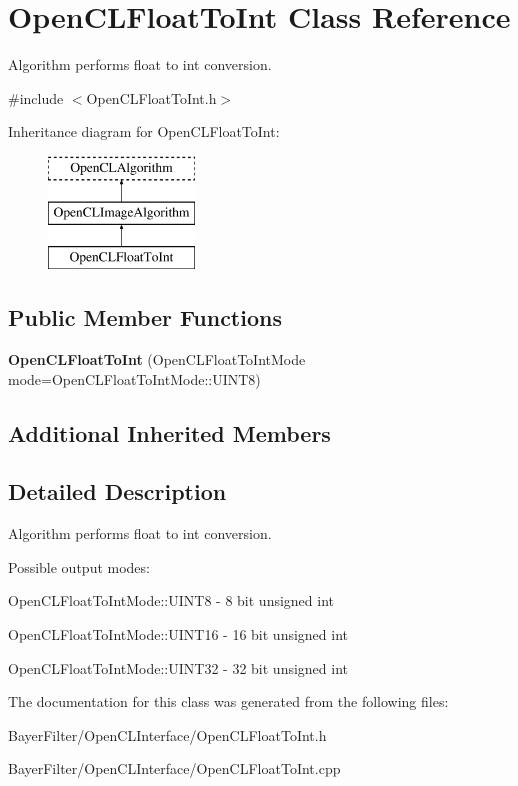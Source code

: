 \hypertarget{class_open_c_l_float_to_int}{\section{Open\-C\-L\-Float\-To\-Int Class Reference}
\label{class_open_c_l_float_to_int}
}


Algorithm performs float to int conversion.  




{\ttfamily \#include $<$Open\-C\-L\-Float\-To\-Int.\-h$>$}

Inheritance diagram for Open\-C\-L\-Float\-To\-Int\-:\begin{figure}[H]
\begin{center}
\leavevmode
\includegraphics[height=3.000000cm]{class_open_c_l_float_to_int}
\end{center}
\end{figure}
\subsection*{Public Member Functions}
\begin{DoxyCompactItemize}
\item 
\hypertarget{class_open_c_l_float_to_int_af489585d5af10a6350133be43c6dd948}{{\bfseries Open\-C\-L\-Float\-To\-Int} (Open\-C\-L\-Float\-To\-Int\-Mode mode=Open\-C\-L\-Float\-To\-Int\-Mode\-::\-U\-I\-N\-T8)}\label{class_open_c_l_float_to_int_af489585d5af10a6350133be43c6dd948}

\end{DoxyCompactItemize}
\subsection*{Additional Inherited Members}


\subsection{Detailed Description}
Algorithm performs float to int conversion. 

Possible output modes\-:
\begin{DoxyItemize}
\item Open\-C\-L\-Float\-To\-Int\-Mode\-::\-U\-I\-N\-T8 -\/ 8 bit unsigned int
\item Open\-C\-L\-Float\-To\-Int\-Mode\-::\-U\-I\-N\-T16 -\/ 16 bit unsigned int
\item Open\-C\-L\-Float\-To\-Int\-Mode\-::\-U\-I\-N\-T32 -\/ 32 bit unsigned int 
\end{DoxyItemize}

The documentation for this class was generated from the following files\-:\begin{DoxyCompactItemize}
\item 
Bayer\-Filter/\-Open\-C\-L\-Interface/Open\-C\-L\-Float\-To\-Int.\-h\item 
Bayer\-Filter/\-Open\-C\-L\-Interface/Open\-C\-L\-Float\-To\-Int.\-cpp\end{DoxyCompactItemize}
